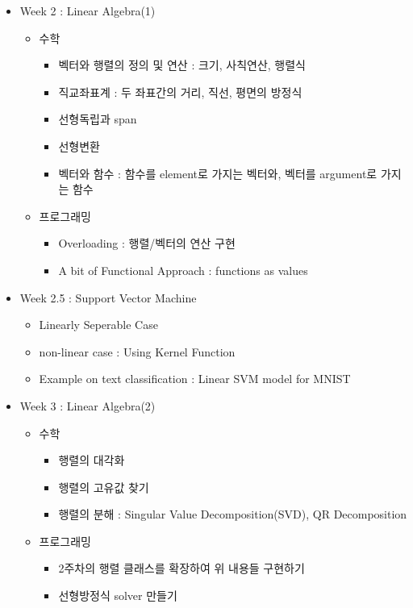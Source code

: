 \documentclass[11pt, a4paper]{article}
\begin{document}
\begin{center}
\begin{flushleft}
\begin{itemize}
\item Week 2 : Linear Algebra(1)

\begin{itemize} 
\item 수학 
\begin{itemize}
\item 벡터와 행렬의 정의 및 연산 : 크기, 사칙연산, 행렬식
\item 직교좌표계 : 두 좌표간의 거리, 직선, 평면의 방정식
\item 선형독립과 span
\item 선형변환
\item 벡터와 함수 : 함수를 element로 가지는 벡터와, 벡터를 argument로 가지는 함수 
\end{itemize} 
\item 프로그래밍 
\begin{itemize} 
\item Overloading : 행렬/벡터의 연산 구현 
\item A bit of Functional Approach : functions as values 
\end{itemize} 
\end{itemize}


\item Week 2.5 : Support Vector Machine
\begin{itemize} 
\item Linearly Seperable Case 
\item non-linear case : Using Kernel Function
\item Example on text classification : Linear SVM model for MNIST
\end{itemize}


\item Week 3 : Linear Algebra(2) 

\begin{itemize} 
\item 수학 
\begin{itemize}
\item 행렬의 대각화 
\item 행렬의 고유값 찾기 
\item 행렬의 분해 : Singular Value Decomposition(SVD), QR Decomposition 
\end{itemize} 
\item 프로그래밍 
\begin{itemize} 
\item 2주차의 행렬 클래스를 확장하여 위 내용들 구현하기 
\item 선형방정식 solver 만들기 
\end{itemize} 
\end{itemize}


\end{itemize}
\end{flushleft}
\end{center}
\end{document}
